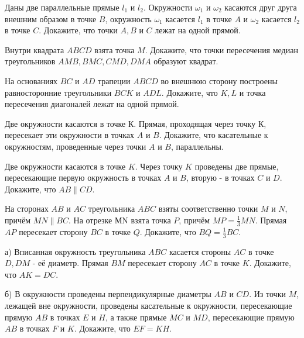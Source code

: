 Даны две параллельные прямые $l_1$ и $l_2$. Окружности $\omega_1$ и $\omega_2$ касаются друг друга внешним образом в точке $B$, окружность $\omega_1$ касается $l_1$ в точке $A$ и $\omega_2$ касается $l_2$ в точке $C$. Докажите, что точки $A,B \text{ и } C$ лежат на одной прямой.

Внутри квадрата $ABCD$ взята точка $M$. Докажите, что точки пересечения медиан треугольников $AMB, BMC, CMD, DMA$ образуют квадрат.

На основаниях $BC$ и $AD$ трапеции $ABCD$ во внешнюю сторону построены равносторонние треугольники $BCK$ и $ADL$. Докажите, что $K,L$ и точка пересечения диагоналей лежат на одной прямой.

Две окружности касаются в точке $К$. Прямая, проходящая через точку $К$, пересекает эти окружности в точках $A$ и $B$. Докажите, что касательные к окружностям, проведенные через точки $A$ и $B$, параллельны.

Две окружности касаются в точке $K$. Через точку $K$ проведены две прямые, пересекающие первую окружность в точках $A$ и $B$, вторую - в точках $C$ и $D$. Докажите, что $A B \| C D$.

На сторонах $A B$ и $A C$ треугольника $A B C$ взяты соответственно точки $M$ и $N$, причём $M N \| B C$. На отрезке МN взята точка $P$, причём $M P=\frac{1}{3} M N$. Прямая $A P$ пересекает сторону $B C$ в точке $Q$. Докажите, что $B Q=\frac{1}{3} B C$.

а) Вписанная окружность треугольника $A B C$ касается стороны $A C$ в точке $D, D M$ - её диаметр. Прямая $B M$ пересекает сторону $A C$ в точке $K$. Докажите, что $A K=D C$.

\noindent
б) В окружности проведены перпендикулярные диаметры $A B$ и $C D$. Из точки $M$, лежащей вне окружности, проведены касательные к окружности, пересекающие прямую $A B$ в точках $E$ и $H$, а также прямые $M C$ и $M D$, пересекающие прямую $A B$ в точках $F$ и $K$. Докажите, что $E F=K H$.